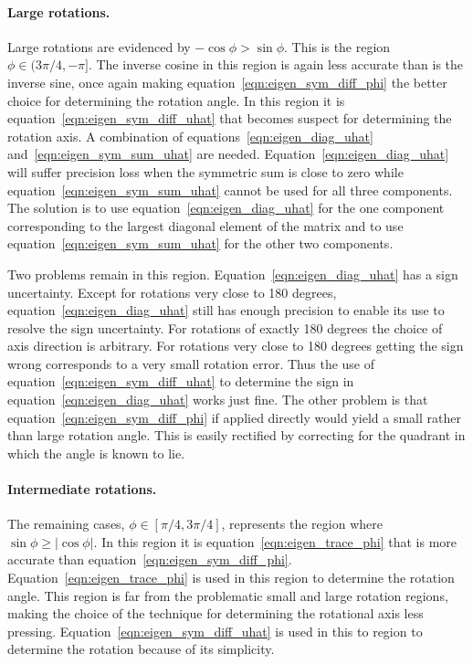 \paragraph{Large rotations.}
Large rotations are evidenced by $-\cos\phi > \sin\phi$. This is the
region $\phi\in(3\pi/4,-\pi]$.  The inverse cosine in this region is again less
accurate than is the inverse sine, once again making
equation~\eqref{eqn:eigen_sym_diff_phi} the better choice
for determining the rotation angle.
In this region it is equation~\eqref{eqn:eigen_sym_diff_uhat} that becomes
suspect for determining the rotation axis.
A combination of equations~\eqref{eqn:eigen_diag_uhat}
and~\eqref{eqn:eigen_sym_sum_uhat} are needed.
Equation~\eqref{eqn:eigen_diag_uhat} will suffer precision loss when the
symmetric sum is close to zero while equation~\eqref{eqn:eigen_sym_sum_uhat}
cannot be used for all three components. The solution is to use
equation~\eqref{eqn:eigen_diag_uhat} for the one component corresponding to
the largest diagonal element of the matrix and to use
equation~\eqref{eqn:eigen_sym_sum_uhat} for the other two components.

Two problems remain in this region. Equation~\eqref{eqn:eigen_diag_uhat} has
a sign uncertainty. Except for rotations very close to 180 degrees,
equation~\eqref{eqn:eigen_diag_uhat} still has enough precision to enable its
use to resolve the sign uncertainty. For rotations of exactly 180 degrees
the choice of axis direction is arbitrary. For rotations very close to 180
degrees getting the sign wrong corresponds to a very small rotation error.
Thus the use of equation~\eqref{eqn:eigen_sym_diff_uhat} to
determine the sign in equation~\eqref{eqn:eigen_diag_uhat} works just fine.
The other problem is that equation~\eqref{eqn:eigen_sym_diff_phi} if
applied directly would yield a small rather than large rotation angle.
This is easily rectified by correcting for the quadrant in which the
angle is known to lie.

\paragraph{Intermediate rotations.}
The remaining cases, $\phi\in[\pi/4,3\pi/4]$, represents the region where
$\sin\phi \ge |\cos\phi|$.
In this region it is equation~\eqref{eqn:eigen_trace_phi} that is more
accurate than equation~\eqref{eqn:eigen_sym_diff_phi}.
Equation~\eqref{eqn:eigen_trace_phi} is used in this region to determine
the rotation angle.  This region is far from the problematic small and large
rotation regions, making the choice of the technique for determining the
rotational axis less pressing. Equation~\eqref{eqn:eigen_sym_diff_uhat} is
used in this to region to determine the rotation because of its simplicity.


